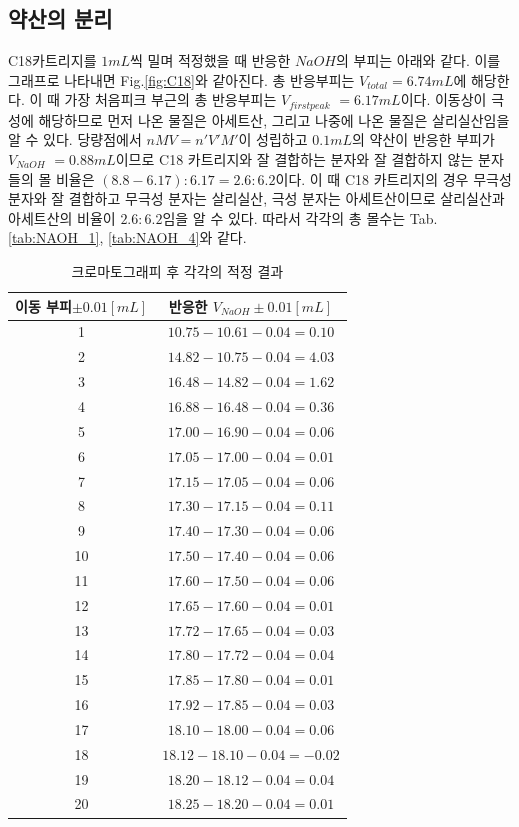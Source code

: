 \documentclass[%
 reprint,
 amsmath,amssymb,
 aps,
]{revtex4-2}
\begin{document}
\subsection{\label{sec:level2}약산의 분리}
C18카트리지를 $1mL$씩 밀며 적정했을 때 반응한 $NaOH$의 부피는 아래와 같다. 이를 그래프로 나타내면 Fig.\ref{fig:C18}와 같아진다. 총 반응부피는 $V_{total} = 6.74mL$에 해당한다. 이 때 가장 처음피크 부근의 총 반응부피는 $V_{first peak}$ $=6.17mL$이다. 이동상이 극성에 해당하므로 먼저 나온 물질은 아세트산, 그리고 나중에 나온 물질은 살리실산임을 알 수 있다. 당량점에서 $nMV = n'V'M'$이 성립하고 $0.1mL$의 약산이 반응한 부피가 $V_{NaOH}$ $=0.88mL$이므로 C18 카트리지와 잘 결합하는 분자와 잘 결합하지 않는 분자들의 몰 비율은 $(8.8 - 6.17):6.17=2.6:6.2$이다. 이 때 C18 카트리지의 경우 무극성 분자와 잘 결합하고 무극성 분자는 살리실산, 극성 분자는 아세트산이므로 살리실산과 아세트산의 비율이 $2.6:6.2$임을 알 수 있다. 따라서 각각의 총 몰수는 Tab.\ref{tab:NAOH_1}, \ref{tab:NAOH_4}와 같다. 
\begin{table}[]
\begin{tabular}{c|c} \hline \hline
이동 부피$\pm 0.01 [mL]$ & 반응한 $V_{NaOH} \pm0.01 [mL]$ \\ \hline
1 & $10.75-10.61  - 0.04 = 0.10$\\ \hline
2 & $14.82-10.75 - 0.04 = 4.03$\\ \hline
3 & $16.48-14.82 - 0.04 = 1.62$\\ \hline
4 &$ 16.88-16.48 - 0.04 = 0.36$\\ \hline
5 &$ 17.00-16.90 - 0.04 = 0.06$\\ \hline
6 &$ 17.05-17.00 - 0.04 = 0.01$\\ \hline
7 &$ 17.15-17.05 - 0.04 = 0.06$\\ \hline
8 &$ 17.30-17.15 - 0.04 = 0.11$\\ \hline
9 &$ 17.40-17.30 - 0.04 = 0.06$\\ \hline
10 &$ 17.50-17.40 - 0.04 = 0.06$\\ \hline
11 &$ 17.60-17.50 - 0.04 = 0.06$\\ \hline
12 &$ 17.65-17.60 - 0.04 = 0.01$\\ \hline
13 &$ 17.72-17.65 - 0.04 = 0.03$\\ \hline
14 &$ 17.80-17.72 - 0.04 = 0.04$\\ \hline
15 &$ 17.85-17.80 - 0.04 = 0.01$\\ \hline
16 &$ 17.92-17.85 - 0.04 = 0.03$\\ \hline
17 &$ 18.10-18.00 - 0.04 = 0.06$\\ \hline
18 &$ 18.12-18.10 - 0.04 = -0.02$\\ \hline
19 &$ 18.20-18.12 - 0.04 = 0.04$\\ \hline
20 &$ 18.25-18.20 - 0.04 = 0.01$\\ \hline \hline
\end{tabular}
\caption{\label{tab:C18}크로마토그래피 후 각각의 적정 결과}
\end{table}
\end{document}
